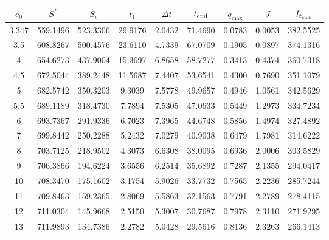 \begin{tabular}{ccccccccc}
\toprule
$c_0$ & $S^*$ & $S_c$ & $t_1$ & $\Delta t$ & $t_{\rm end}$ & $q_{\max}$ & $J$ & $I_{t_{\rm cum}}$ \\
\midrule
3.347 & 559.1496 & 523.3306 & 29.9176 & 2.0432 & 71.4690 & 0.0783 & 0.0053 & 382.5525 \\
3.5 & 608.8267 & 500.4576 & 23.6110 & 4.7339 & 67.0709 & 0.1905 & 0.0897 & 374.1316 \\
4 & 654.6273 & 437.9004 & 15.3697 & 6.8658 & 58.7277 & 0.3413 & 0.4374 & 360.7318 \\
4.5 & 672.5044 & 389.2448 & 11.5687 & 7.4407 & 53.6541 & 0.4300 & 0.7690 & 351.1079 \\
5 & 682.5742 & 350.3203 & 9.3039 & 7.5778 & 49.9657 & 0.4946 & 1.0561 & 342.5629 \\
5.5 & 689.1189 & 318.4730 & 7.7894 & 7.5305 & 47.0633 & 0.5449 & 1.2973 & 334.7234 \\
6 & 693.7367 & 291.9336 & 6.7023 & 7.3965 & 44.6748 & 0.5856 & 1.4974 & 327.4892 \\
7 & 699.8442 & 250.2288 & 5.2432 & 7.0279 & 40.9038 & 0.6479 & 1.7981 & 314.6222 \\
8 & 703.7125 & 218.9502 & 4.3073 & 6.6308 & 38.0095 & 0.6936 & 2.0006 & 303.5829 \\
9 & 706.3866 & 194.6224 & 3.6556 & 6.2514 & 35.6892 & 0.7287 & 2.1355 & 294.0417 \\
10 & 708.3470 & 175.1602 & 3.1754 & 5.9026 & 33.7732 & 0.7565 & 2.2236 & 285.7244 \\
11 & 709.8463 & 159.2365 & 2.8069 & 5.5863 & 32.1563 & 0.7791 & 2.2789 & 278.4115 \\
12 & 711.0304 & 145.9668 & 2.5150 & 5.3007 & 30.7687 & 0.7978 & 2.3110 & 271.9295 \\
13 & 711.9893 & 134.7386 & 2.2782 & 5.0428 & 29.5616 & 0.8136 & 2.3263 & 266.1413 \\
\bottomrule
\end{tabular}
